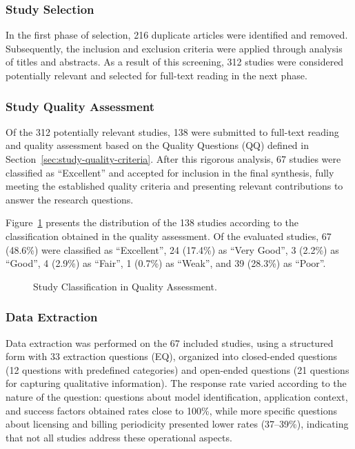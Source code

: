 \documentclass[journal]{IEEEtran}
\begin{document}
\subsubsection{Study Selection}\label{sec:study-selection}
In the first phase of selection, 216 duplicate articles were identified and removed. Subsequently, the inclusion and exclusion criteria were applied through analysis of titles and abstracts. As a result of this screening, 312 studies were considered potentially relevant and selected for full-text reading in the next phase.

\subsubsection{Study Quality Assessment}\label{sec:quality-evaluation}
Of the 312 potentially relevant studies, 138 were submitted to full-text reading and quality assessment based on the Quality Questions (QQ) defined in Section~\ref{sec:study-quality-criteria}. After this rigorous analysis, 67 studies were classified as ``Excellent'' and accepted for inclusion in the final synthesis, fully meeting the established quality criteria and presenting relevant contributions to answer the research questions.

Figure~\ref{fig:quality-papers-evaluation} presents the distribution of the 138 studies according to the classification obtained in the quality assessment. Of the evaluated studies, 67 (48.6\%) were classified as ``Excellent'', 24 (17.4\%) as ``Very Good'', 3 (2.2\%) as ``Good'', 4 (2.9\%) as ``Fair'', 1 (0.7\%) as ``Weak'', and 39 (28.3\%) as ``Poor''.

\begin{figure}[!htb]
    \centering
    
    \caption{Study Classification in Quality Assessment.}
    \label{fig:quality-papers-evaluation}
\end{figure}

\subsubsection{Data Extraction}\label{sec:data-extraction}
Data extraction was performed on the 67 included studies, using a structured form with 33 extraction questions (EQ), organized into closed-ended questions (12 questions with predefined categories) and open-ended questions (21 questions for capturing qualitative information). The response rate varied according to the nature of the question: questions about model identification, application context, and success factors obtained rates close to 100\%, while more specific questions about licensing and billing periodicity presented lower rates (37--39\%), indicating that not all studies address these operational aspects.
\end{document}
